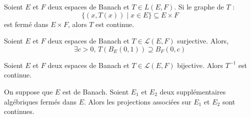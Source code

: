   \begin{application}
    Soient $E$ et $F$ deux espaces de Banach et $T \in L(E,F)$. Si le graphe de $T$ :
    \[ \{ (x, T(x)) \mid x \in E \} \subseteq E \times F \]
    est fermé dans $E \times F$, alors $T$ est continue.
  \end{application}

  \begin{application}
    Soient $E$ et $F$ deux espaces de Banach et $T \in \mathcal{L}(E,F)$ surjective. Alors,
    \[ \exists c > 0, \, T\left(B_E(0,1)\right) \supseteq B_F(0,c) \]
  \end{application}

  \begin{corollary}
    Soient $E$ et $F$ deux espaces de Banach et $T \in \mathcal{L}(E,F)$ bijective. Alors $T^{-1}$ est continue.
  \end{corollary}

  \begin{corollary}
    On suppose que $E$ est de Banach. Soient $E_1$ et $E_2$ deux supplémentaires algébriques fermés dans $E$. Alors les projections associées sur $E_1$ et $E_2$ sont continues.
  \end{corollary}

